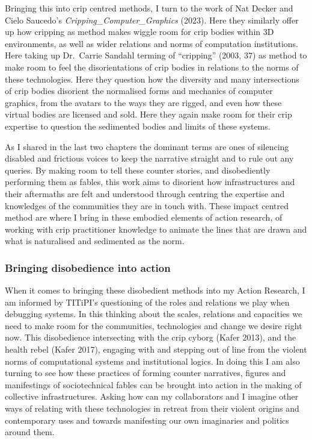Bringing this into crip centred methods, I turn to the work of Nat
Decker and Cielo Saucedo's \emph{Cripping\_Computer\_Graphics} (2023).
Here they similarly offer up how cripping as method makes wiggle room
for crip bodies within 3D environments, as well as wider relations and
norms of computation institutions. Here taking up Dr.~Carrie Sandahl
terming of ``cripping'' (2003, 37) as method to make room to feel the
disorientations of crip bodies in relations to the norms of these
technologies. Here they question how the diversity and many
intersections of crip bodies disorient the normalised forms and
mechanics of computer graphics, from the avatars to the ways they are
rigged, and even how these virtual bodies are licensed and sold. Here
they again make room for their crip expertise to question the sedimented
bodies and limits of these systems.

As I shared in the last two chapters the dominant terms are ones of
silencing disabled and frictious voices to keep the narrative straight
and to rule out any queries. By making room to tell these counter
stories, and disobediently performing them as fables, this work aims to
disorient how infrastructures and their aftermaths are felt and
understood through centring the expertise and knowledges of the
communities they are in touch with. These impact centred method are
where I bring in these embodied elements of action research, of working
with crip practitioner knowledge to animate the lines that are drawn and
what is naturalised and sedimented as the norm.

\hypertarget{bringing-disobedience-into-action}{%
\subsubsection{Bringing disobedience into
action}\label{bringing-disobedience-into-action}}

When it comes to bringing these disobedient methods into my Action
Research, I am informed by TITiPI's questioning of the roles and
relations we play when debugging systems. In this thinking about the
scales, relations and capacities we need to make room for the
communities, technologies and change we desire right now. This
disobedience intersecting with the crip cyborg (Kafer 2013), and the
health rebel (Kafer 2017), engaging with and stepping out of line from
the violent norms of computational systems and institutional logics. In
doing this I am also turning to see how these practices of forming
counter narratives, figures and manifestings of sociotechnical fables
can be brought into action in the making of collective infrastructures.
Asking how can my collaborators and I imagine other ways of relating
with these technologies in retreat from their violent origins and
contemporary uses and towards manifesting our own imaginaries and
politics around them.

